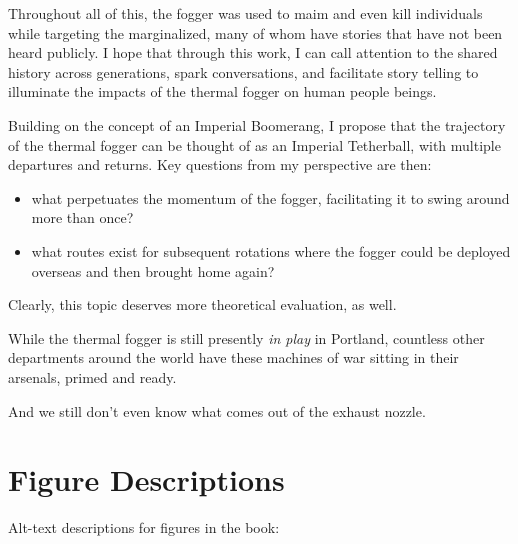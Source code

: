 \documentclass[
  11pt,
]{krantz}
\providecommand{\tightlist}{%
  \setlength{\itemsep}{0pt}\setlength{\parskip}{0pt}}
\begin{document}
Throughout all of this, the fogger was used to maim and even kill individuals while targeting the marginalized, many of whom have stories that have not been heard publicly.
I hope that through this work, I can call attention to the shared history across generations, spark conversations, and facilitate story telling to illuminate the impacts of the thermal fogger on human people beings.

Building on the concept of an Imperial Boomerang, I propose that the trajectory of the thermal fogger can be thought of as an Imperial Tetherball, with multiple departures and returns.
Key questions from my perspective are then:

\begin{itemize}
\tightlist
\item
  what perpetuates the momentum of the fogger, facilitating it to swing around more than once?
\item
  what routes exist for subsequent rotations where the fogger could be deployed overseas and then brought home again?
\end{itemize}

Clearly, this topic deserves more theoretical evaluation, as well.

While the thermal fogger is still presently \emph{in play} in Portland, countless other departments around the world have these machines of war sitting in their arsenals, primed and ready.

And we still don't even know what comes out of the exhaust nozzle.

\cleardoublepage

\hypertarget{appendix-appendices}{%
\appendix {}}


\hypertarget{AltTexts}{%
\chapter{Figure Descriptions}\label{AltTexts}}

Alt-text descriptions for figures in the book:
\end{document}
